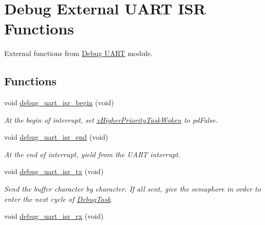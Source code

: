 \hypertarget{group___debug___external___functions}{}\section{Debug External U\+A\+RT I\+SR Functions}
\label{group___debug___external___functions}


External functions from \hyperlink{group___debug___uart}{Debug U\+A\+RT} module.  


\subsection*{Functions}
\begin{DoxyCompactItemize}
\item 
void \hyperlink{group___debug___external___functions_ga9d19c0e57b2d37c01bd781338322f682}{debug\+\_\+uart\+\_\+isr\+\_\+begin} (void)\hypertarget{group___debug___external___functions_ga9d19c0e57b2d37c01bd781338322f682}{}\label{group___debug___external___functions_ga9d19c0e57b2d37c01bd781338322f682}

\begin{DoxyCompactList}\small\item\em At the begin of interrupt, set \hyperlink{group___debug___private___variables_ga9d9a749ad99ec3d4a6886d5277b9ba87}{x\+Higher\+Priority\+Task\+Woken} to pd\+False. \end{DoxyCompactList}\item 
void \hyperlink{group___debug___external___functions_ga3f4c952ea2b6368ccbb0572addd76601}{debug\+\_\+uart\+\_\+isr\+\_\+end} (void)\hypertarget{group___debug___external___functions_ga3f4c952ea2b6368ccbb0572addd76601}{}\label{group___debug___external___functions_ga3f4c952ea2b6368ccbb0572addd76601}

\begin{DoxyCompactList}\small\item\em At the end of interrupt, yield from the U\+A\+RT interrupt. \end{DoxyCompactList}\item 
void \hyperlink{group___debug___external___functions_gaee765dd75f3414ade869071798ff33f4}{debug\+\_\+uart\+\_\+isr\+\_\+tx} (void)\hypertarget{group___debug___external___functions_gaee765dd75f3414ade869071798ff33f4}{}\label{group___debug___external___functions_gaee765dd75f3414ade869071798ff33f4}

\begin{DoxyCompactList}\small\item\em Send the buffer character by character. If all sent, give the semaphore in order to enter the next cycle of \hyperlink{group___debug___exported___functions___group3_ga0e7fca846e34e06a1f62249fe8a30a44}{Debug\+Task}. \end{DoxyCompactList}\item 
void \hyperlink{group___debug___external___functions_ga2e1878be0250daf30f0a286af6e683e9}{debug\+\_\+uart\+\_\+isr\+\_\+rx} (void)\hypertarget{group___debug___external___functions_ga2e1878be0250daf30f0a286af6e683e9}{}\label{group___debug___external___functions_ga2e1878be0250daf30f0a286af6e683e9}


\end{DoxyCompactItemize}
